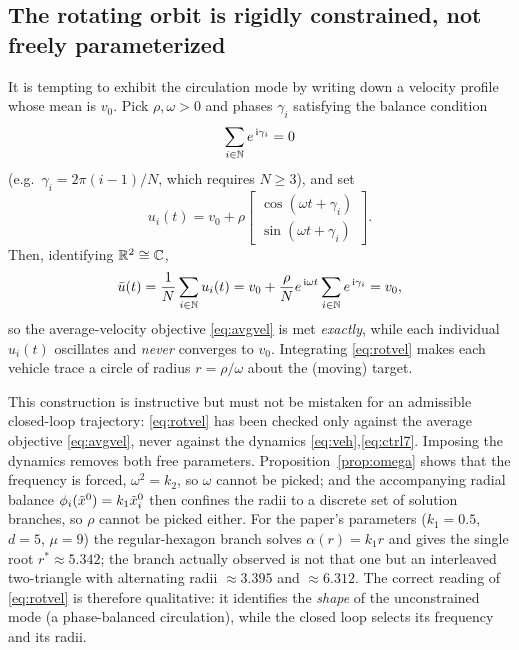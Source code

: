 \subsection{The rotating orbit is rigidly constrained, not freely parameterized}
\label{sec:notfree}
It is tempting to exhibit the circulation mode by writing down a velocity profile whose mean is
$v_0$. Pick $\rho,\omega>0$ and phases $\gamma_i$ satisfying the balance condition
\begin{equation}
  \sum_{i\in\mathbb{N}} e^{\,\mathrm{i}\gamma_i}=0
  \label{eq:balance}
\end{equation}
(e.g.\ $\gamma_i=2\pi(i-1)/N$, which requires $N\ge3$), and set
\begin{equation}
  u_i(t)=v_0+\rho
  \begin{bmatrix}
    \cos(\omega t+\gamma_i)\\
    \sin(\omega t+\gamma_i)
  \end{bmatrix}.
  \label{eq:rotvel}
\end{equation}
Then, identifying $\mathbb{R}^2\cong\mathbb C$,
\begin{equation}
  \bar{u}(t)=\frac{1}{N}\sum_{i\in\mathbb{N}}u_i(t)
        =v_0+\frac{\rho}{N}e^{\,\mathrm{i}\omega t}\sum_{i\in\mathbb{N}}e^{\,\mathrm{i}\gamma_i}
        =v_0,
\end{equation}
so the average-velocity objective \eqref{eq:avgvel} is met \emph{exactly}, while each individual
$u_i(t)$ oscillates and \emph{never} converges to $v_0$. Integrating \eqref{eq:rotvel} makes each
vehicle trace a circle of radius $r=\rho/\omega$ about the (moving) target.

This construction is instructive but must not be mistaken for an admissible closed-loop trajectory:
\eqref{eq:rotvel} has been checked only against the average objective \eqref{eq:avgvel}, never
against the dynamics \eqref{eq:veh},\eqref{eq:ctrl7}. Imposing the dynamics removes both free
parameters. Proposition~\ref{prop:omega} shows that the frequency is forced,
$\omega^2=k_2$, so $\omega$ cannot be picked; and the accompanying radial balance
$\phi_i(\tilde{x}^0)=k_1\tilde{x}_i^0$ then confines the radii to a discrete set of solution branches, so
$\rho$ cannot be picked either. For the paper's parameters ($k_1=0.5$, $d=5$, $\mu=9$) the
regular-hexagon branch solves $\alpha(r)=k_1r$ and gives the single root $r^*\approx5.342$; the
branch actually observed is not that one but an interleaved two-triangle with alternating radii
$\approx3.395$ and $\approx6.312$. The correct reading of \eqref{eq:rotvel} is therefore
qualitative: it identifies the \emph{shape} of the unconstrained mode (a phase-balanced
circulation), while the closed loop selects its frequency and its radii.

